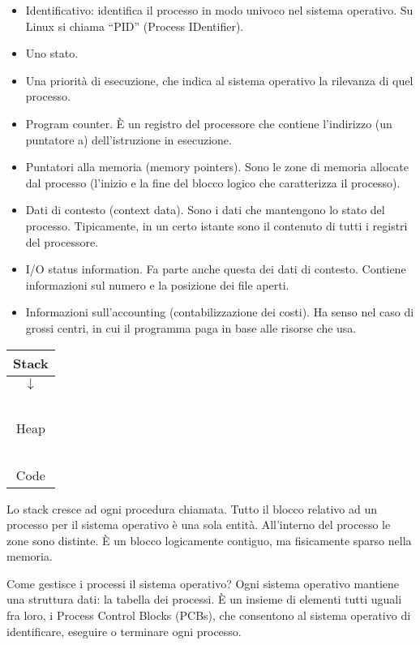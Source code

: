 \begin{itemize}
    \item Identificativo: identifica il processo in modo univoco nel sistema operativo. Su Linux si chiama ``PID'' (Process IDentifier).
    \item Uno stato.
    \item Una priorit\`a di esecuzione, che indica al sistema operativo la rilevanza di quel processo.
    \item Program counter. \`E un registro del processore che contiene l'indirizzo (un puntatore a) dell'istruzione in esecuzione.
    \item Puntatori alla memoria (memory pointers). Sono le zone di memoria allocate dal processo (l'inizio e la fine del blocco logico che caratterizza il processo).
    \item Dati di contesto (context data). Sono i dati che mantengono lo stato del processo. Tipicamente, in un certo istante sono il contenuto di tutti i registri del processore.
    \item I/O status information. Fa parte anche questa dei dati di contesto. Contiene informazioni sul numero e la posizione dei file aperti.
    \item Informazioni sull'accounting (contabilizzazione dei costi). Ha senso nel caso di grossi centri, in cui il programma paga in base alle risorse  che usa.
\end{itemize}

\begin{center}
\begin{tabular}{|c|}
\hline
Stack \\
\hline
$\downarrow$ \\
\ \\
Heap \\
\ \\
\hline
Code \\
\hline
\end{tabular}
\end{center}

Lo stack cresce ad ogni procedura chiamata. Tutto il blocco relativo ad un processo per il sistema operativo \`e una sola entit\`a. All'interno del processo le zone sono distinte. \`E un blocco logicamente contiguo, ma fisicamente sparso nella memoria.

Come gestisce i processi il sistema operativo? Ogni sistema operativo mantiene una struttura dati: la tabella dei processi. \`E un insieme di elementi tutti uguali fra loro, i Process Control Blocks (PCBs), che consentono al sistema operativo di identificare, eseguire o terminare ogni processo.

